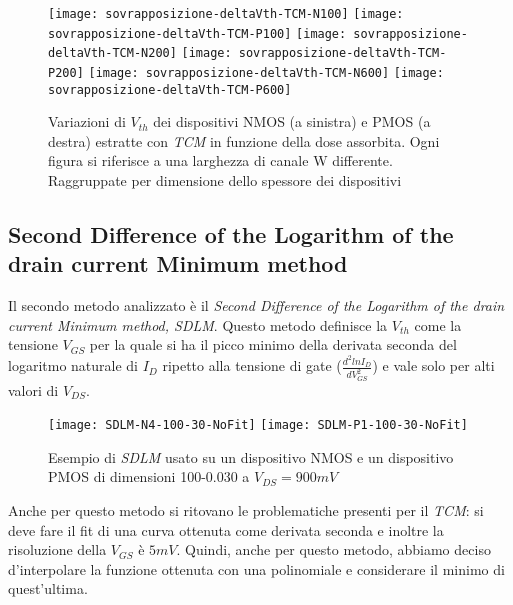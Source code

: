 \begin{figure}[H]
  \centering
  \texttt{[image: sovrapposizione-deltaVth-TCM-N100]}
  \texttt{[image: sovrapposizione-deltaVth-TCM-P100]}
  \texttt{[image: sovrapposizione-deltaVth-TCM-N200]}
  \texttt{[image: sovrapposizione-deltaVth-TCM-P200]}
  \texttt{[image: sovrapposizione-deltaVth-TCM-N600]}
  \texttt{[image: sovrapposizione-deltaVth-TCM-P600]}

  \caption{Variazioni di $V_{th}$ dei dispositivi NMOS (a sinistra) e PMOS (a destra) estratte con \emph{TCM} in funzione della dose assorbita. Ogni figura si riferisce a una larghezza di canale W differente. Raggruppate per dimensione dello spessore dei dispositivi}
  \label{fig:deltaVthTCM}
\end{figure}

\subsection{Second Difference of the Logarithm of the drain current Minimum method}
Il secondo metodo analizzato è il \emph{Second Difference of the Logarithm of the drain current Minimum method, SDLM}. Questo metodo definisce la $V_{th}$ come la tensione $V_{GS}$ per la quale si ha il picco minimo della derivata seconda del logaritmo naturale di $I_D$ ripetto alla tensione di gate ($\frac{d^2lnI_D}{dV_{GS}^2}$) e vale solo per alti valori di $V_{DS}$\cite{art1}.

\begin{figure}[H]
  \centering
  \texttt{[image: SDLM-N4-100-30-NoFit]}
  \texttt{[image: SDLM-P1-100-30-NoFit]}
  \caption{Esempio di \emph{SDLM} usato su un dispositivo NMOS e un dispositivo PMOS di dimensioni 100-0.030 a $V_{DS} = 900 mV$}
\end{figure}

Anche per questo metodo si ritovano le problematiche presenti per il \emph{TCM}: si deve fare il fit di una curva ottenuta come derivata seconda e inoltre la risoluzione della $V_{GS}$ è $5mV$.
Quindi, anche per questo metodo, abbiamo deciso d'interpolare la funzione ottenuta con una polinomiale e considerare il minimo di quest'ultima.

